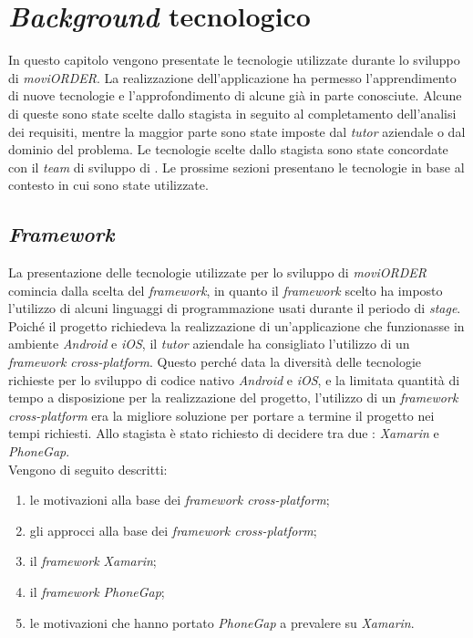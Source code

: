 
\chapter{\textit{Background} tecnologico} \label{background}

In questo capitolo vengono presentate le tecnologie utilizzate durante lo sviluppo di \textit{moviORDER}. La realizzazione dell'applicazione ha permesso l'apprendimento di nuove tecnologie e l'approfondimento di alcune già in parte conosciute. Alcune di queste sono state scelte dallo stagista in seguito al completamento dell'analisi dei requisiti, mentre la maggior parte sono state imposte dal \textit{tutor} aziendale o dal dominio del problema. Le tecnologie scelte dallo stagista sono state concordate con il \textit{team} di sviluppo di \visione{}. Le prossime sezioni presentano le tecnologie in base al contesto in cui sono state utilizzate.

\section{\textit{Framework}}	

La presentazione delle tecnologie utilizzate per lo sviluppo di \textit{moviORDER} comincia dalla scelta del \textit{framework}, in quanto il \textit{framework} scelto ha imposto l'utilizzo di alcuni linguaggi di programmazione usati durante il periodo di \textit{stage}. Poiché il progetto richiedeva la realizzazione di un'applicazione che funzionasse in ambiente \textit{Android} e \textit{iOS}, il \textit{tutor} aziendale ha consigliato l'utilizzo di un \textit{framework cross-platform}. Questo perché data la diversità delle tecnologie richieste per lo sviluppo di codice nativo \textit{Android} e \textit{iOS}, e la limitata quantità di tempo a disposizione per la realizzazione del progetto, l'utilizzo di un \textit{framework cross-platform} era la migliore soluzione per portare a termine il progetto nei tempi richiesti. Allo stagista è stato richiesto di decidere tra due : \textit{Xamarin} e \textit{PhoneGap}.\\ Vengono di seguito descritti:
\begin{enumerate}
	\item le motivazioni alla base dei \textit{framework cross-platform};
	\item gli approcci alla base dei \textit{framework cross-platform};
	\item il \textit{framework Xamarin};
	\item il \textit{framework PhoneGap};
	\item le motivazioni che hanno portato \textit{PhoneGap} a prevalere su \textit{Xamarin}.
\end{enumerate}

